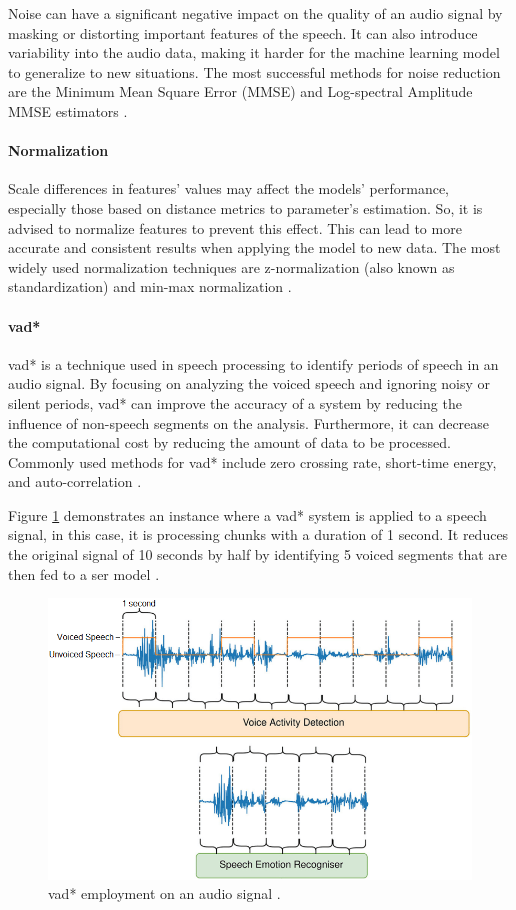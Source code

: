 Noise can have a significant negative impact on the quality of an audio signal by masking or distorting important features of the speech. It can also introduce variability into the audio data, making it harder for the machine learning model to generalize to new situations. The most successful methods for noise reduction are the Minimum Mean Square Error (MMSE) and Log-spectral Amplitude MMSE estimators \cite{Pohjalainen2016}.

\paragraph{Normalization}

Scale differences in features' values may affect the models' performance, especially those based on distance metrics to parameter's estimation. So, it is advised to normalize features to prevent this effect. This can lead to more accurate and consistent results when applying the model to new data. The most widely used normalization techniques are z-normalization (also known as standardization) and min-max normalization \cite{Akay2020}.

\paragraph{\acl{vad*}}

\ac{vad*} is a technique used in speech processing to identify periods of speech in an audio signal. By focusing on analyzing the voiced speech and ignoring noisy or silent periods, \ac{vad*} can improve the accuracy of a system by reducing the influence of non-speech segments on the analysis. Furthermore, it can decrease the computational cost by reducing the amount of data to be processed. Commonly used methods for \ac{vad*} include zero crossing rate, short-time energy, and auto-correlation \cite{Akay2020}.

Figure \ref{fig:vad} demonstrates an instance where a \ac{vad*} system is applied to a speech signal, in this case, it is processing chunks with a duration of 1 second. It reduces the original signal of 10 seconds by half by identifying 5 voiced segments that are then fed to a \ac{ser} model \cite{Milling2022}.

\begin{figure}
  \centering
  \includegraphics[width=.8\linewidth]{figs/3_methodology/speech_activity_detection.png}
  \caption{\acl{vad*} employment on an audio signal \cite{Milling2022}.}
  \label{fig:vad}
\end{figure}


